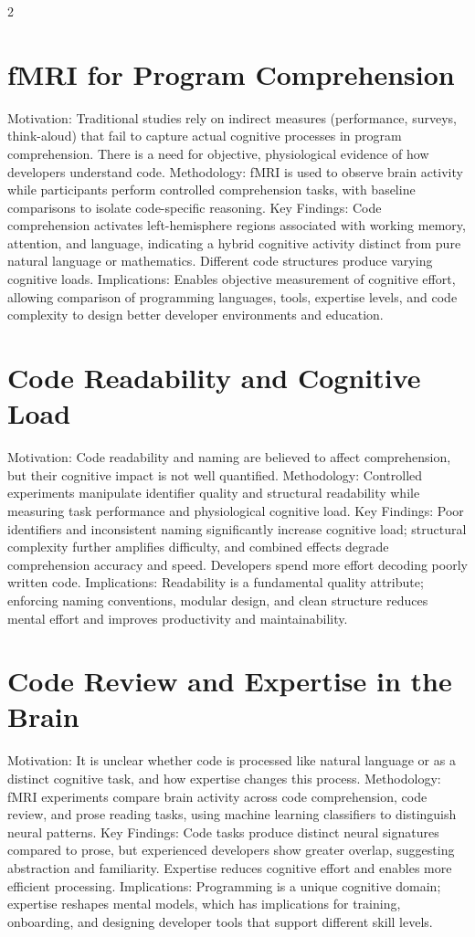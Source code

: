 \documentclass[8pt,a4paper]{extarticle}
\begin{document}
\begin{multicols*}{2}

    \section{fMRI for Program Comprehension}
    Motivation: Traditional studies rely on indirect measures (performance, surveys, think-aloud) that fail to capture actual cognitive processes in program comprehension. There is a need for objective, physiological evidence of how developers understand code. Methodology: fMRI is used to observe brain activity while participants perform controlled comprehension tasks, with baseline comparisons to isolate code-specific reasoning. Key Findings: Code comprehension activates left-hemisphere regions associated with working memory, attention, and language, indicating a hybrid cognitive activity distinct from pure natural language or mathematics. Different code structures produce varying cognitive loads. Implications: Enables objective measurement of cognitive effort, allowing comparison of programming languages, tools, expertise levels, and code complexity to design better developer environments and education.

    \section{Code Readability and Cognitive Load}
    Motivation: Code readability and naming are believed to affect comprehension, but their cognitive impact is not well quantified. Methodology: Controlled experiments manipulate identifier quality and structural readability while measuring task performance and physiological cognitive load. Key Findings: Poor identifiers and inconsistent naming significantly increase cognitive load; structural complexity further amplifies difficulty, and combined effects degrade comprehension accuracy and speed. Developers spend more effort decoding poorly written code. Implications: Readability is a fundamental quality attribute; enforcing naming conventions, modular design, and clean structure reduces mental effort and improves productivity and maintainability.

    \section{Code Review and Expertise in the Brain}
    Motivation: It is unclear whether code is processed like natural language or as a distinct cognitive task, and how expertise changes this process. Methodology: fMRI experiments compare brain activity across code comprehension, code review, and prose reading tasks, using machine learning classifiers to distinguish neural patterns. Key Findings: Code tasks produce distinct neural signatures compared to prose, but experienced developers show greater overlap, suggesting abstraction and familiarity. Expertise reduces cognitive effort and enables more efficient processing. Implications: Programming is a unique cognitive domain; expertise reshapes mental models, which has implications for training, onboarding, and designing developer tools that support different skill levels.


\end{multicols*}
\end{document}
